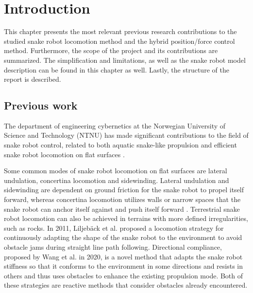 
\chapter{Introduction}\label{Chapter:introduction}

This chapter presents the most relevant previous research contributions to the studied snake robot locomotion method and the hybrid position/force control method. Furthermore, the scope of the project and its contributions are summarized. The simplification and limitations, as well as the snake robot model description can be found in this chapter as well. Lastly, the structure of the report is described.

\section{Previous work}

The department of engineering cybernetics at the Norwegian University of Science and Technology (NTNU) has made significant contributions to the field of snake robot control, related to both aquatic snake-like propulsion and efficient snake robot locomotion on flat surfaces \cite{StavdahlNote}.

Some common modes of snake robot locomotion on flat surfaces are lateral undulation, concertina locomotion and sidewinding. Lateral undulation and sidewinding are dependent on ground friction for the snake robot to propel itself forward, whereas concertina locomotion utilizes walls or narrow spaces that the snake robot can anchor itself against and push itself forward \cite{liljeback2012snake}. Terrestrial snake robot locomotion can also be achieved in terrains with more defined irregularities, such as rocks. In 2011, Liljebäck et al. \cite{liljeback2011snake} proposed a locomotion strategy for continuously adapting the shape of the snake robot to the environment to avoid obstacle jams during straight line path following. Directional compliance, proposed by Wang et al. \cite{wang2020directional} in 2020, is a novel method that adapts the snake robot stiffness so that it conforms to the environment in some directions and resists in others and thus uses obstacles to enhance the existing propulsion mode. Both of these strategies are reactive methods that consider obstacles already encountered.

